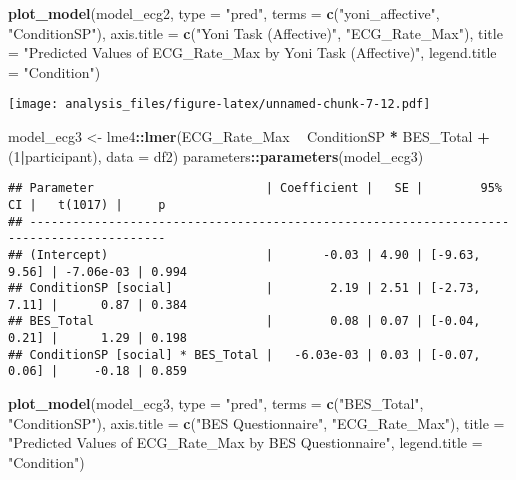 \documentclass[
]{article}
\newenvironment{Shaded}{\begin{snugshade}}{\end{snugshade}}
\newcommand{\DataTypeTok}[1]{\textcolor[rgb]{0.13,0.29,0.53}{#1}}
\newcommand{\DecValTok}[1]{\textcolor[rgb]{0.00,0.00,0.81}{#1}}
\newcommand{\KeywordTok}[1]{\textcolor[rgb]{0.13,0.29,0.53}{\textbf{#1}}}
\newcommand{\NormalTok}[1]{#1}
\newcommand{\OperatorTok}[1]{\textcolor[rgb]{0.81,0.36,0.00}{\textbf{#1}}}
\newcommand{\StringTok}[1]{\textcolor[rgb]{0.31,0.60,0.02}{#1}}
\begin{document}
\begin{Shaded}
\begin{Highlighting}[]
\KeywordTok{plot_model}\NormalTok{(model_ecg2, }\DataTypeTok{type =} \StringTok{"pred"}\NormalTok{, }\DataTypeTok{terms =} \KeywordTok{c}\NormalTok{(}\StringTok{"yoni_affective"}\NormalTok{, }\StringTok{"ConditionSP"}\NormalTok{), }\DataTypeTok{axis.title =} \KeywordTok{c}\NormalTok{(}\StringTok{"Yoni Task (Affective)"}\NormalTok{, }\StringTok{"ECG_Rate_Max"}\NormalTok{), }\DataTypeTok{title =} \StringTok{"Predicted Values of ECG_Rate_Max by Yoni Task (Affective)"}\NormalTok{, }\DataTypeTok{legend.title =} \StringTok{"Condition"}\NormalTok{)}
\end{Highlighting}
\end{Shaded}

\texttt{[image: analysis\_files/figure-latex/unnamed-chunk-7-12.pdf]}

\begin{Shaded}
\begin{Highlighting}[]
\NormalTok{model_ecg3 <-}\StringTok{ }\NormalTok{lme4}\OperatorTok{::}\KeywordTok{lmer}\NormalTok{(ECG_Rate_Max }\OperatorTok{~}\StringTok{ }\NormalTok{ConditionSP }\OperatorTok{*}\StringTok{ }\NormalTok{BES_Total }\OperatorTok{+}\StringTok{ }\NormalTok{(}\DecValTok{1}\OperatorTok{|}\NormalTok{participant), }\DataTypeTok{data =}\NormalTok{ df2)}
\NormalTok{parameters}\OperatorTok{::}\KeywordTok{parameters}\NormalTok{(model_ecg3)}
\end{Highlighting}
\end{Shaded}

\begin{verbatim}
## Parameter                        | Coefficient |   SE |        95% CI |   t(1017) |     p
## -----------------------------------------------------------------------------------------
## (Intercept)                      |       -0.03 | 4.90 | [-9.63, 9.56] | -7.06e-03 | 0.994
## ConditionSP [social]             |        2.19 | 2.51 | [-2.73, 7.11] |      0.87 | 0.384
## BES_Total                        |        0.08 | 0.07 | [-0.04, 0.21] |      1.29 | 0.198
## ConditionSP [social] * BES_Total |   -6.03e-03 | 0.03 | [-0.07, 0.06] |     -0.18 | 0.859
\end{verbatim}

\begin{Shaded}
\begin{Highlighting}[]
\KeywordTok{plot_model}\NormalTok{(model_ecg3, }\DataTypeTok{type =} \StringTok{"pred"}\NormalTok{, }\DataTypeTok{terms =} \KeywordTok{c}\NormalTok{(}\StringTok{"BES_Total"}\NormalTok{, }\StringTok{"ConditionSP"}\NormalTok{), }\DataTypeTok{axis.title =} \KeywordTok{c}\NormalTok{(}\StringTok{"BES Questionnaire"}\NormalTok{, }\StringTok{"ECG_Rate_Max"}\NormalTok{), }\DataTypeTok{title =} \StringTok{"Predicted Values of ECG_Rate_Max by BES Questionnaire"}\NormalTok{, }\DataTypeTok{legend.title =} \StringTok{"Condition"}\NormalTok{)}
\end{Highlighting}
\end{Shaded}
\end{document}
